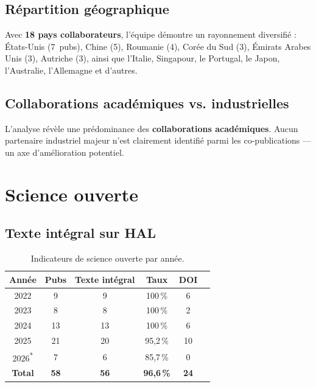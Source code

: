 \documentclass[a4paper,11pt]{article}
\begin{document}
\subsection{Répartition géographique}

Avec \textbf{18 pays collaborateurs}, l'équipe démontre un rayonnement diversifié : États-Unis (7~pubs), Chine (5), Roumanie (4), Corée du Sud (3), Émirats Arabes Unis (3), Autriche (3), ainsi que l'Italie, Singapour, le Portugal, le Japon, l'Australie, l'Allemagne et d'autres.

\subsection{Collaborations académiques vs. industrielles}

L'analyse révèle une prédominance des \textbf{collaborations académiques}. Aucun partenaire industriel majeur n'est clairement identifié parmi les co-publications --- un axe d'amélioration potentiel.

\section{Science ouverte}

\subsection{Texte intégral sur HAL}

\begin{table}[h!]
\centering
\begin{tabular}{cccccc}
\toprule
\textbf{Année} & \textbf{Pubs} & \textbf{Texte intégral} & \textbf{Taux} & \textbf{DOI} \\
\midrule
2022 & 9  & 9  & 100\,\%   & 6 \\
2023 & 8  & 8  & 100\,\%   & 2 \\
2024 & 13 & 13 & 100\,\%   & 6 \\
2025 & 21 & 20 & 95,2\,\%  & 10 \\
2026\textsuperscript{*} & 7  & 6  & 85,7\,\%  & 0 \\
\midrule
\textbf{Total} & \textbf{58} & \textbf{56} & \textbf{96,6\,\%} & \textbf{24} \\
\bottomrule
\end{tabular}
\caption{Indicateurs de science ouverte par année.}
\end{table}
\end{document}
